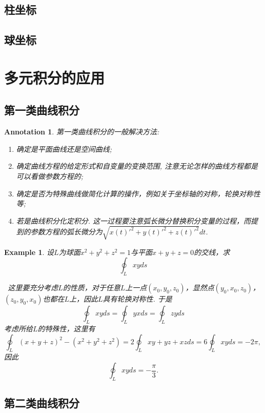 \documentclass{article}
\newtheorem{example}[theorem]{Example}
\newtheorem{annotation}[theorem]{Annotation}
\newcommand{\hints}{{\color{blue} \text{hints}}}
\begin{document}
\subsection{柱坐标}

\subsection{球坐标}


\newpage
\section{多元积分的应用}

\subsection{第一类曲线积分}

\begin{annotation}
\rm 第一类曲线积分的一般解决方法:
\begin{enumerate}
	\item 确定是平面曲线还是空间曲线;
	\item 确定曲线方程的给定形式和自变量的变换范围, 注意无论怎样的曲线方程都是可以看做参数方程的;
	\item 确定是否为特殊曲线做简化计算的操作，例如关于坐标轴的对称，轮换对称性等;
	\item 若是曲线积分化定积分. 这一过程要注意弧长微分替换积分变量的过程，而提到的参数方程的弧长微分为$\sqrt{x(t)'^2 + y(t)'^2 + z(t)'^2}dt$.  
\end{enumerate}
\end{annotation}

\begin{example}
\rm 设$L$为球面$x^2+y^2+z^2=1$与平面$x+y+z=0$的交线，求
$$
\oint_L xyds
$$

\hints\ 这里要充分考虑$L$的性质，对于任意$L$上一点$(x_0,y_0,z_0)$，显然点$(y_0,x_0,z_0)$，$(z_0,y_0,x_0)$也都在$L$上，因此$L$具有轮换对称性. 于是
$$
\oint_L xyds = \oint_L yx ds = \oint_L zyds 
$$
考虑所给$L$的特殊性，这里有
$$
\oint_L (x+y+z)^2 - (x^2+y^2+z^2) = 2 \oint_L xy+yz+xz ds = 6 \oint_L xyds = -2\pi, 
$$
因此
$$
\oint_L xyds = -\frac{\pi}{3}. 
$$
\end{example}

\subsection{第二类曲线积分}
\end{document}
